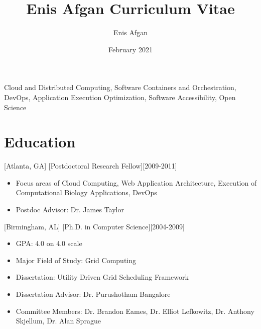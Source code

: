 \documentclass{article}
\title{Enis Afgan Curriculum Vitae}
\author{Enis Afgan}
\date{February 2021}
\begin{document}
{}



\makecvtitle %


\begin{description}[widest=Research interests]
    \item[Research Interests] Cloud and Distributed Computing, Software Containers and Orchestration, DevOps, Application Execution Optimization, Software Accessibility, Open Science
\end{description}
 
\vspace{\parskip}%
\section{Education}


[Atlanta, GA]
[Postdoctoral Research Fellow][2009-2011]
\begin{itemize}
    \item[] Focus areas of Cloud Computing, Web Application Architecture, Execution of Computational Biology Applications, DevOps
    \item[] Postdoc Advisor: Dr. James Taylor
\end{itemize}

[Birmingham, AL]
[Ph.D. in Computer Science][2004-2009]
\begin{itemize}
    \item[] GPA: 4.0 on 4.0 scale
    \item[] Major Field of Study: Grid Computing
    \item[] Dissertation: Utility Driven Grid Scheduling Framework
    \item[] Dissertation Advisor: Dr. Purushotham Bangalore
    \item[] Committee Members: Dr. Brandon Eames, Dr. Elliot Lefkowitz,
Dr. Anthony Skjellum, Dr. Alan Sprague
\end{itemize}
\end{document}

